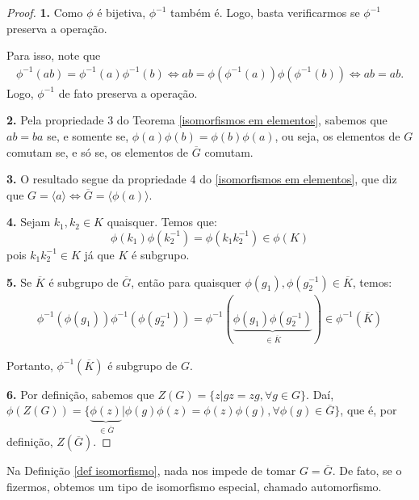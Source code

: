 	\begin{proof}
		\textbf{1.} Como $\phi$ é bijetiva, $\phi^{-1}$ também é. Logo, basta verificarmos se $\phi^{-1}$ preserva a operação. 
		\par\vspace{0.3cm} Para isso, note que 
		\begin{align*}
		\phi^{-1}(ab) = \phi^{-1}(a)\phi^{-1}(b) \Leftrightarrow ab = \phi(\phi^{-1}(a))\phi(\phi^{-1}(b)) \Leftrightarrow ab = ab.
		\end{align*} 
		Logo, $\phi^{-1}$ de fato preserva a operação.
		\par\vspace{0.4cm}
		\textbf{2.} Pela propriedade 3 do Teorema \eqref{isomorfismos em elementos}, sabemos que $ab = ba$ se, e somente se, $\phi(a)\phi(b) = \phi(b)\phi(a)$, ou seja, os elementos de $G$ comutam se, e só se, os elementos de $\overline{G}$ comutam.
		\par\vspace{0.4cm}
		\textbf{3.} O resultado segue da propriedade 4 do \eqref{isomorfismos em elementos}, que diz que $G = \langle a\rangle \Leftrightarrow \overline{G} = \langle \phi(a)\rangle$.
		\par\vspace{0.4cm}
		\textbf{4.} Sejam $k_1, k_2 \in K$ quaisquer. Temos que:
		\begin{equation*}
		\phi(k_1)\phi(k_2^{-1}) = \phi(k_1k_2^{-1}) \in\phi(K)
		\end{equation*}
		pois $k_1k_2^{-1} \in K$ já que $K$ é subgrupo. 
		\par\vspace{0.4cm}
		\textbf{5.} Se $\overline{K}$ é subgrupo de $\overline{G}$, então para quaisquer $\phi(g_1), \phi(g_2^{-1})\in \overline{K}$, temos:
		\begin{align*}
		\phi^{-1}(\phi(g_1))\phi^{-1}(\phi(g_2^{-1})) = \phi^{-1}(\underbrace{\phi(g_1)\phi(g_2^{-1})}_{\in\overline{K}}) \in \phi^{-1}(\overline{K})
		\end{align*}
		\par\vspace{0.3cm} Portanto, $\phi^{-1}(\overline{K})$ é subgrupo de $G$.
		\par\vspace{0.4cm}
		\textbf{6.} Por definição, sabemos que $Z(G) = \{ z|gz = zg, \forall g\in G \}$. Daí, $\phi(Z(G)) = \{ \underbrace{\phi(z)}_{\in \overline{G}} | \phi(g)\phi(z) = \phi(z)\phi(g), \forall \phi(g)\in\overline{G}\}$, que é, por definição, $Z(\overline{G})$.
		
	\end{proof}
	\par\vspace{0.3cm} Na Definição \eqref{def isomorfismo}, nada nos impede de tomar $G = \overline{G}$. De fato, se o fizermos, obtemos um tipo de isomorfismo especial, chamado automorfismo.
	
